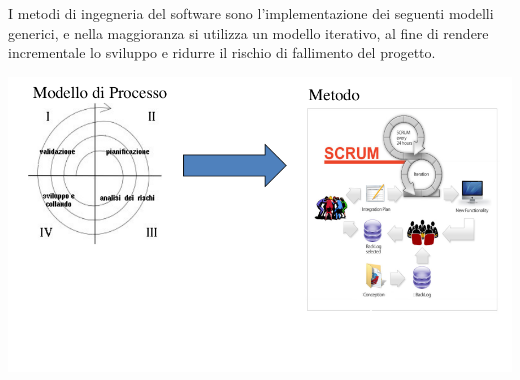 \documentclass[a4paper,12pt, oneside]{book}
\begin{document}
I metodi di ingegneria del software sono l'implementazione dei seguenti modelli generici, e nella
maggioranza si utilizza un modello iterativo, al fine di rendere incrementale lo sviluppo e ridurre
il rischio di fallimento del progetto.
\begin{center}
	\includegraphics[scale=2.0]{img/ing.png}
\end{center}
\end{document}
